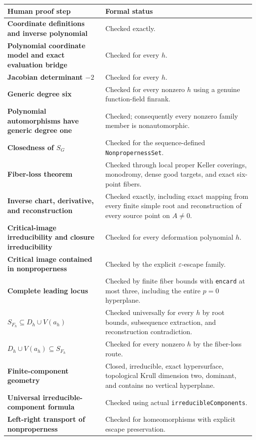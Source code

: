 \documentclass[11pt]{article}
\begin{document}
\begin{center}
\begin{tabularx}{\textwidth}{>{\raggedright\arraybackslash\bfseries}p{}X}
\toprule
Human proof step & Formal status \\
\midrule
Coordinate definitions and inverse polynomial & Checked exactly. \\
Polynomial coordinate model and exact evaluation bridge & Checked for every
$h$. \\
Jacobian determinant $-2$ & Checked for every $h$. \\
Generic degree six & Checked for every nonzero $h$ using a genuine
function-field finrank. \\
Polynomial automorphisms have generic degree one & Checked; consequently every
nonzero family member is nonautomorphic. \\
Closedness of $S_G$ & Checked for the sequence-defined
\texttt{NonpropernessSet}. \\
Fiber-loss theorem & Checked through local proper Keller coverings, monodromy,
dense good targets, and exact six-point fibers. \\
Inverse chart, derivative, and reconstruction & Checked exactly, including
exact mapping from every finite simple root and reconstruction of every source
point on $A\ne0$. \\
Critical-image irreducibility and closure irreducibility & Checked for every
deformation polynomial $h$. \\
Critical image contained in nonproperness & Checked by the explicit
$\varepsilon$-escape family. \\
Complete leading locus & Checked by finite fiber bounds with
\texttt{encard} at most three, including the entire $p=0$ hyperplane. \\
$S_{F_h}\subseteq D_h\cup V(a_h)$ & Checked universally for every $h$ by root
bounds, subsequence extraction, and reconstruction contradiction. \\
$D_h\cup V(a_h)\subseteq S_{F_h}$ & Checked for every nonzero $h$ by the
fiber-loss route. \\
Finite-component geometry & Closed, irreducible, exact hypersurface,
topological Krull dimension two, dominant, and contains no vertical
hyperplane. \\
Universal irreducible-component formula & Checked using actual
\texttt{irreducibleComponents}. \\
Left-right transport of nonproperness & Checked for homeomorphisms with
explicit escape preservation. \\

\end{tabularx}
\end{center}
\end{document}

